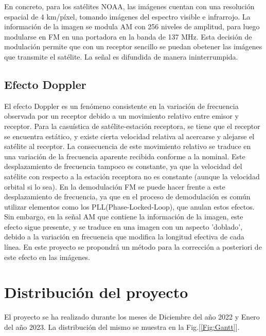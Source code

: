 \documentclass[a4paper,openright,12pt]{article}
\begin{document}
	En concreto, para los satélites NOAA, las imágenes cuentan con una resolución espacial de 4 km/píxel, tomando imágenes del espectro visible e infrarrojo. La información de la imagen se modula AM con 256 niveles de amplitud, para luego modularse en FM en una portadora en la banda de 137 MHz. Esta decisión de modulación permite que con un receptor sencillo se puedan obetener las imágenes que transmite el satélite. La señal es difundida de manera ininterrumpida.

\newpage
	
	
	\subsection{Efecto Doppler}

	El efecto Doppler es un fenómeno consistente en la variación de frecuencia observada por un receptor debido a un movimiento relativo entre emisor y receptor. Para la casuística de satélite-estación receptora, se tiene que el receptor se encuentra estático, y existe cierta velocidad relativa al acercarse y alejarse el satélite al receptor. La consecuencia de este movimiento relativo se traduce en una variación de la frecuencia aparente recibida conforme a la nominal. Este desplazamiento de frecuencia tampoco es constante, ya que la velocidad del satélite con respecto a la estación receptora  no es constante (aunque la velocidad orbital si lo sea). En la demodulación FM se puede hacer frente a este desplazamiento de frecuencia, ya que en el proceso de demodulación es común utilizar elementos como los PLL(Phase-Locked-Loop), que anulan estos efectos. Sin embargo, en la señal AM que contiene la información de la imagen, este efecto sigue presente, y se traduce en una imagen con un aspecto 'doblado', debido a la variación en frecuencia que modifica la longitud efectiva de cada línea. En este proyecto se propondrá un método para la corrección a posteriori de este efecto en las imágenes.

\section{Distribución del proyecto}
El proyecto se ha realizado durante los meses de Diciembre del año 2022 y Enero del año 2023. La distribución del mismo se muestra en la Fig.[\ref{Fig:Gantt}].
\end{document}
